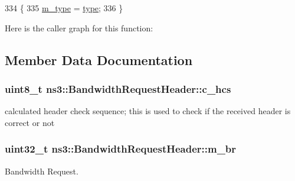 \begin{DoxyCode}
334 \{
335   \hyperlink{classns3_1_1BandwidthRequestHeader_acbf2b6dc3bfefc47d08cf6edc673ec97}{m\_type} = \hyperlink{visualizer-ideas_8txt_add98db9e15e2a58cf2b57623e7aa893a}{type};
336 \}
\end{DoxyCode}


Here is the caller graph for this function\+:




\subsection{Member Data Documentation}
\subsubsection[{\texorpdfstring{c\+\_\+hcs}{c_hcs}}]{\setlength{\rightskip}{0pt plus 5cm}uint8\+\_\+t ns3\+::\+Bandwidth\+Request\+Header\+::c\+\_\+hcs\hspace{0.3cm}{\ttfamily [private]}}\hypertarget{classns3_1_1BandwidthRequestHeader_a58a8219646d0c9055de4931cccdc0a95}{}\label{classns3_1_1BandwidthRequestHeader_a58a8219646d0c9055de4931cccdc0a95}


calculated header check sequence; this is used to check if the received header is correct or not 

\subsubsection[{\texorpdfstring{m\+\_\+br}{m_br}}]{\setlength{\rightskip}{0pt plus 5cm}uint32\+\_\+t ns3\+::\+Bandwidth\+Request\+Header\+::m\+\_\+br\hspace{0.3cm}{\ttfamily [private]}}\hypertarget{classns3_1_1BandwidthRequestHeader_aaf45b47717a872f2cce8d64791d79cc6}{}\label{classns3_1_1BandwidthRequestHeader_aaf45b47717a872f2cce8d64791d79cc6}


Bandwidth Request. 

